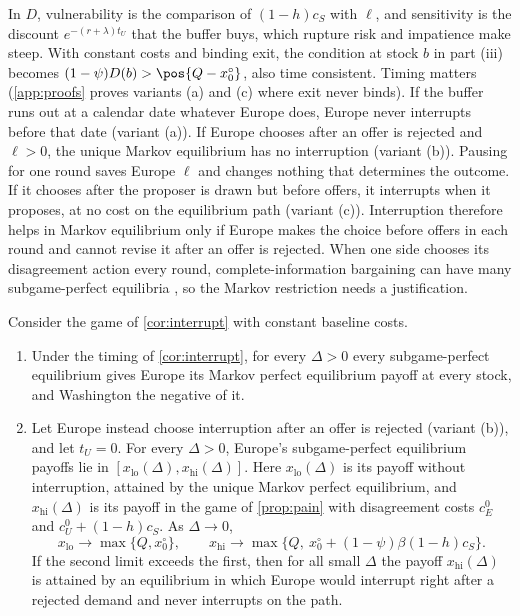 In $D$, vulnerability is the comparison of $(1-h)c_S$ with $\ell$, and sensitivity is the discount $e^{-(r+\lambda)t_U}$ that the buffer buys, which rupture risk and impatience make steep. With constant costs and binding exit, the condition at stock $b$ in part (iii) becomes $(1-\psi)D(b)>\pos{Q-x^\circ_0}$, also time consistent. Timing matters (\cref{app:proofs} proves variants (a) and (c) where exit never binds). If the buffer runs out at a calendar date whatever Europe does, Europe never interrupts before that date (variant (a)). If Europe chooses after an offer is rejected and $\ell>0$, the unique Markov equilibrium has no interruption (variant (b)). Pausing for one round saves Europe $\ell$ and changes nothing that determines the outcome. If it chooses after the proposer is drawn but before offers, it interrupts when it proposes, at no cost on the equilibrium path (variant (c)). Interruption therefore helps in Markov equilibrium only if Europe makes the choice before offers in each round and cannot revise it after an offer is rejected. When one side chooses its disagreement action every round, complete-information bargaining can have many subgame-perfect equilibria \citep{fernandez1991striking, haller1990letter, busch1995perfect}, so the Markov restriction needs a justification.

\begin{proposition}\label{prop:range}
Consider the game of \cref{cor:interrupt} with constant baseline costs.
\begin{enumerate}[label=(\roman*)]
\item Under the timing of \cref{cor:interrupt}, for every $\Delta>0$ every subgame-perfect equilibrium gives Europe its Markov perfect equilibrium payoff at every stock, and Washington the negative of it.
\item Let Europe instead choose interruption after an offer is rejected (variant (b)), and let $t_U=0$. For every $\Delta>0$, Europe's subgame-perfect equilibrium payoffs lie in $[x_{\mathrm{lo}}(\Delta),x_{\mathrm{hi}}(\Delta)]$. Here $x_{\mathrm{lo}}(\Delta)$ is its payoff without interruption, attained by the unique Markov perfect equilibrium, and $x_{\mathrm{hi}}(\Delta)$ is its payoff in the game of \cref{prop:pain} with disagreement costs $c^0_E$ and $c^0_U+(1-h)c_S$. As $\Delta\to0$,
\[ x_{\mathrm{lo}}\to\max\{Q,x^\circ_0\},\qquad x_{\mathrm{hi}}\to\max\{Q,\ x^\circ_0+(1-\psi)\beta(1-h)c_S\}. \]
If the second limit exceeds the first, then for all small $\Delta$ the payoff $x_{\mathrm{hi}}(\Delta)$ is attained by an equilibrium in which Europe would interrupt right after a rejected demand and never interrupts on the path.
\end{enumerate}
\end{proposition}

